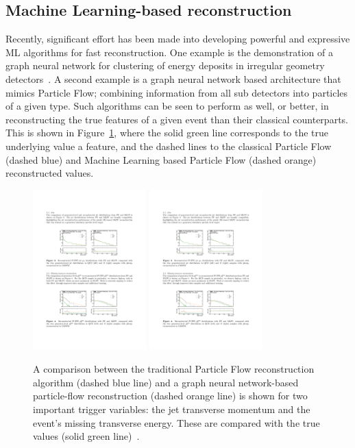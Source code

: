 \documentclass[12pt]{iopart}
\begin{document}
\subsection{Machine Learning-based reconstruction}
Recently, significant effort has been made into developing powerful and expressive ML algorithms for fast reconstruction. One example is the demonstration of a graph neural network for clustering of energy deposits in irregular geometry detectors~\cite{garnet}. A second example is a graph neural network based architecture that mimics Particle Flow; combining information from all sub detectors into particles of a given type. Such algorithms can be seen to perform as well, or better, in reconstructing the true features of a given event than their classical counterparts. This is shown in Figure~\ref{fig:mlpf}, where the solid green line corresponds to the true underlying value a feature, and the dashed lines to the classical Particle Flow (dashed blue) and Machine Learning based Particle Flow (dashed orange) reconstructed values.
\begin{figure}[ht]
    \centering
    \includegraphics[width=0.39\textwidth]{figures/mlpf_jetpt.pdf}
    \includegraphics[width=0.39\textwidth]{figures/mlpf_met.pdf}
    \caption{A comparison between the traditional Particle Flow reconstruction algorithm (dashed blue line) and a graph neural network-based particle-flow reconstruction (dashed orange line) is shown for two important trigger variables: the jet transverse momentum and the event's missing transverse energy. These are compared with the true values (solid green line)~\cite{mokhtar2023progress}.}
    \label{fig:mlpf}
\end{figure}
\end{document}
